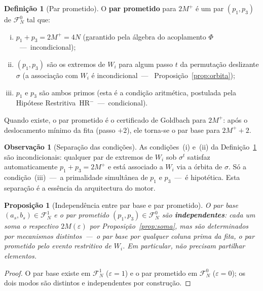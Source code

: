 \documentclass[12pt, a4paper]{article}
\theoremstyle{plain}
\newtheorem{proposition}[theorem]{Proposição}
\theoremstyle{definition}
\newtheorem{definition}[theorem]{Definição}
\newtheorem{remark}[theorem]{Observação}
\theoremstyle{remark}
\begin{document}
	\begin{definition}[Par prometido]
		\label{def:prometido}
		O \textbf{par prometido} para $2M^+$ é um par $(p_1,p_3)$ de
		$\mathcal{F}_N^0$ tal que:
		\begin{enumerate}[(i)]
			\item $p_1+p_3=2M^+=4N$
			(garantido pela álgebra do acoplamento $\Phi$~---~incondicional);
			\item $(p_1,p_3)$ são os extremos de $W_i$ para algum
			passo $t$ da permutação deslizante $\sigma$
			(a associação com $W_i$ é incondicional~---~
			Proposição~\ref{prop:orbita});
			\item $p_1$ e $p_3$ são ambos primos
			(esta é a condição aritmética, postulada pela Hipótese
			Restritiva~HR$^-$~---~condicional).
		\end{enumerate}
		Quando existe, o par prometido é o certificado de Goldbach para
		$2M^+$: após o deslocamento mínimo da fita (passo $+2$), ele
		torna-se o par base para $2M^++2$.
	\end{definition}
	
	\begin{remark}[Separação das condições]
		As condições~(i) e~(ii) da Definição~\ref{def:prometido} são
		incondicionais: qualquer par de extremos de $W_i$ sob
		$\sigma^t$ satisfaz automaticamente $p_1+p_3=2M^+$ e está
		associado a $W_i$ via a órbita de $\sigma$.  Só a
		condição~(iii)~---~a primalidade simultânea de $p_1$ e $p_3$~---~é
		hipotética.  Esta separação é a essência da arquitectura do motor.
	\end{remark}
	
	\begin{proposition}[Independência entre par base e par prometido]
		\label{prop:indep}
		O par base $(a_s,b_s)\in\mathcal{F}_N^1$ e o par prometido
		$(p_1,p_3)\in\mathcal{F}_N^0$ são \textbf{independentes}: cada
		um soma o respectivo $2M(\varepsilon)$ por
		Proposição~\ref{prop:soma}, mas são determinados por mecanismos
		distintos~---~o par base por qualquer coluna prima da fita, o par
		prometido pelo evento restritivo de $W_i$.  Em particular,
		não precisam partilhar elementos.
	\end{proposition}
	
	\begin{proof}
		O par base existe em $\mathcal{F}_N^1$ ($\varepsilon=1$) e o par
		prometido em $\mathcal{F}_N^0$ ($\varepsilon=0$); os dois modos
		são distintos e independentes por construção.
	\end{proof}
	
\end{document}
